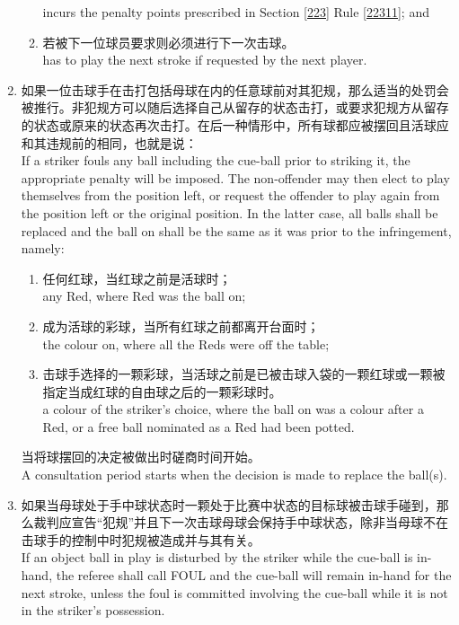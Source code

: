 \begin{enumerate}[label=(\alph*)]
\begin{enumerate}[label=(\roman*)]
        incurs the penalty points prescribed in Section \ref{223} Rule \ref{22311}; and
        \item 若被下一位球员要求则必须进行下一次击球。\\
        has to play the next stroke if requested by the next player.
    \end{enumerate}
    \item \label{22310i}如果一位击球手在击打包括母球在内的任意球前对其犯规，那么适当的处罚会被推行。非犯规方可以随后选择自己从留存的状态击打，或要求犯规方从留存的状态或原来的状态再次击打。在后一种情形中，所有球都应被摆回且活球应和其违规前的相同，也就是说：\\
    If a striker fouls any ball including the cue-ball prior to striking it, the appropriate penalty will be imposed. The non-offender may then elect to play themselves from the position left, or request the offender to play again from the position left or the original position. In the latter case, all balls shall be replaced and the ball on shall be the same as it was prior to the infringement, namely:
    \begin{enumerate}[label=(\roman*)]
        \item 任何红球，当红球之前是活球时；\\
        any Red, where Red was the ball on;
        \item 成为活球的彩球，当所有红球之前都离开台面时；\\
        the colour on, where all the Reds were off the table;
        \item 击球手选择的一颗彩球，当活球之前是已被击球入袋的一颗红球或一颗被指定当成红球的自由球之后的一颗彩球时。\\
        a colour of the striker's choice, where the ball on was a colour after a Red, or a free ball nominated as a Red had been potted.
    \end{enumerate}
    当将球摆回的决定被做出时磋商时间开始。\\
    A consultation period starts when the decision is made to replace the ball(s).
    \item 如果当母球处于手中球状态时一颗处于比赛中状态的目标球被击球手碰到，那么裁判应宣告``犯规''并且下一次击球母球会保持手中球状态，除非当母球不在击球手的控制中时犯规被造成并与其有关。\\
    If an object ball in play is disturbed by the striker while the cue-ball is in-hand, the referee shall call FOUL and the cue-ball will remain in-hand for the next stroke, unless the foul is committed involving the cue-ball while it is not in the striker's possession.
\end{enumerate}

